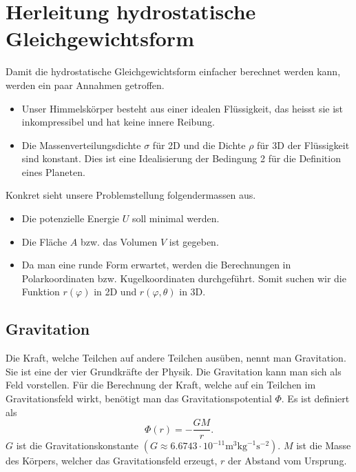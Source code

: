 %
%
%
%
\section{Herleitung hydrostatische Gleichgewichtsform
\label{planet:section:teil1}}
Damit die hydrostatische Gleichgewichtsform einfacher berechnet werden kann, werden ein paar Annahmen getroffen.
\begin{itemize}
	\item Unser Himmelskörper besteht aus einer idealen Flüssigkeit, das heisst sie ist inkompressibel und hat keine innere Reibung.
	\item Die Massenverteilungsdichte \(\sigma\) für 2D und die Dichte \(\rho\) für 3D der Flüssigkeit sind konstant.
	Dies ist eine Idealisierung der Bedingung 2 für die Definition eines Planeten.
\end{itemize}

\noindent
Konkret sieht unsere Problemstellung folgendermassen aus.
\begin{itemize}
	\item Die potenzielle Energie \(U\) soll minimal werden.
	\item Die Fläche \(A\) bzw. das Volumen \(V\) ist gegeben.
	\item Da man eine runde Form erwartet, werden die Berechnungen in Polarkoordinaten bzw. Kugelkoordinaten durchgeführt. Somit suchen wir die Funktion \(r(\varphi)\) in 2D und \(r(\varphi,\theta)\) in 3D.
\end{itemize}

\subsection{Gravitation}

Die Kraft, welche Teilchen auf andere Teilchen ausüben, nennt man Gravitation.
Sie ist eine der vier Grundkräfte der Physik.
Die Gravitation kann man sich als Feld vorstellen.
Für die Berechnung der Kraft, welche auf ein Teilchen im Gravitationsfeld wirkt, benötigt man das Gravitationspotential \(\Phi\).
Es ist definiert als
\begin{equation}
	\Phi(r) = -\frac{GM}{r}.
	\label{planet:equ:gravpot}
\end{equation}
\(G\) ist die Gravitationskonstante \((G \approx 6.6743 \cdot 10^{-11} \text{m}^3 \text{kg}^{-1} \text{s}^{-2})\).
\(M\) ist die Masse des Körpers, welcher das Gravitationsfeld erzeugt, \(r\) der Abstand vom Ursprung.

